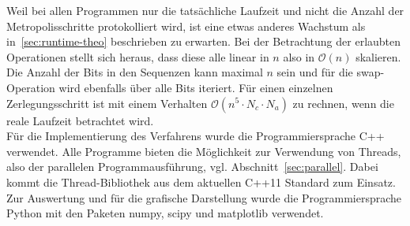 Weil bei allen Programmen nur die tatsächliche Laufzeit und nicht die Anzahl der Metropolisschritte protokolliert wird, ist eine etwas anderes Wachstum als in~\ref{sec:runtime-theo} beschrieben zu erwarten. Bei der Betrachtung der erlaubten Operationen stellt sich heraus, dass diese alle linear in $n$ also in $\mathcal{O}\left(n\right)$ skalieren. Die Anzahl der Bits in den Sequenzen kann maximal $n$ sein und für die swap-Operation wird ebenfalls über alle Bits iteriert. Für einen einzelnen Zerlegungsschritt ist mit einem Verhalten $\mathcal{O}\left(n^5\cdot N_c\cdot N_a\right)$ zu rechnen, wenn die reale Laufzeit betrachtet wird.\\
Für die Implementierung des Verfahrens wurde die Programmiersprache C++ verwendet. Alle Programme bieten die Möglichkeit zur Verwendung von Threads, also der parallelen Programmausführung, vgl. Abschnitt~\ref{sec:parallel}. Dabei kommt die Thread-Bibliothek aus dem aktuellen C++11 Standard zum Einsatz. \\
Zur Auswertung und für die grafische Darstellung wurde die Programmiersprache Python mit den Paketen numpy, scipy und matplotlib verwendet. \\ 

